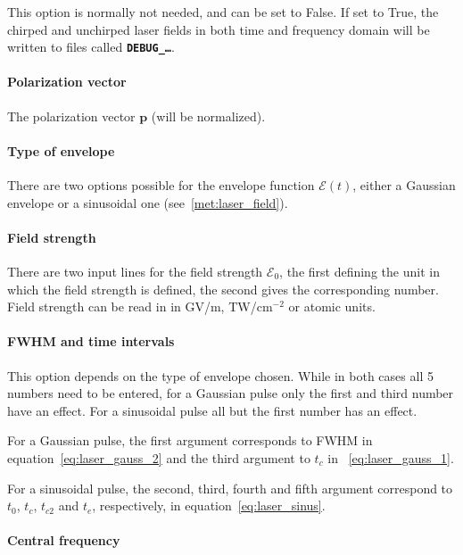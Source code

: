 \documentclass[a4paper,10pt,DIV=15,openany,twoside=false]{scrbook}
\newcommand{\ttt}[1]{\textbf{\texttt{#1}}}
\newcommand{\VEC}[1]{\ensuremath{\mathbf{#1}}}
\begin{document}
This option is normally not needed, and can be set to False. If set to True, the chirped and unchirped laser fields in both time and frequency domain will be written to files called \ttt{DEBUG\_\dots}.

\paragraph{Polarization vector}

The polarization vector $\VEC{p}$ (will be normalized).

\paragraph{Type of envelope}

There are two options possible for the envelope function $\mathcal{E}(t)$, either a Gaussian envelope or a sinusoidal one (see~\ref{met:laser_field}).

\paragraph{Field strength}

There are two input lines for the field strength $\mathcal{E}_0$, the first defining the unit in which the field strength is defined, the second gives the corresponding number. Field strength can be read in in GV/m, TW/cm$^{-2}$ or atomic units.

\paragraph{FWHM and time intervals}

This option depends on the type of envelope chosen. While in both cases all 5 numbers need to be entered, for a Gaussian pulse only the first and third number have an effect. For a sinusoidal pulse all but the first number has an effect.

For a Gaussian pulse, the first argument corresponds to FWHM in equation~\eqref{eq:laser_gauss_2} and the third argument to $t_c$ in ~\eqref{eq:laser_gauss_1}.

For a sinusoidal pulse, the second, third, fourth and fifth argument correspond to $t_0$, $t_c$, $t_{c2}$ and $t_e$, respectively, in equation~\eqref{eq:laser_sinus}.

\paragraph{Central frequency}
\end{document}
